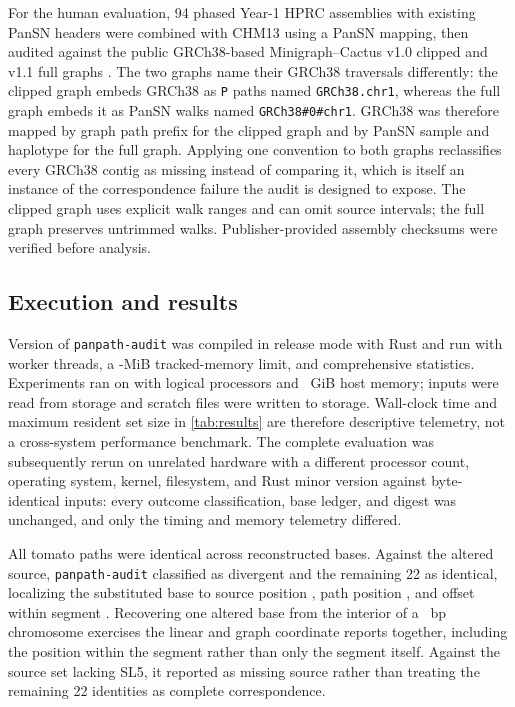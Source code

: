 \documentclass[10pt]{article}
\newcommand{\software}[1]{\texttt{#1}}
\begin{document}
For the human evaluation, 94 phased Year-1 HPRC assemblies with existing PanSN
headers were combined with CHM13 using a PanSN mapping, then audited against the
public GRCh38-based Minigraph--Cactus v1.0 clipped and v1.1 full graphs
\cite{liao2023draft,hickey2023minigraph}. The two graphs name their GRCh38
traversals differently: the clipped graph embeds GRCh38 as \texttt{P} paths named
\texttt{GRCh38.chr1}, whereas the full graph embeds it as PanSN walks named
\texttt{GRCh38\#0\#chr1}. GRCh38 was therefore mapped by graph path prefix for the
clipped graph and by PanSN sample and haplotype for the full graph. Applying one
convention to both graphs reclassifies every GRCh38 contig as missing instead of
comparing it, which is itself an instance of the correspondence failure the audit
is designed to expose. The clipped graph uses explicit walk ranges and can omit
source intervals; the full graph preserves untrimmed walks.
Publisher-provided assembly checksums were verified before analysis.

\subsection{Execution and results}

Version \EnvToolVersion{} of \software{panpath-audit} \cite{panpathsoftware} was
compiled in release mode with Rust \EnvRustVersion{} and run with \EnvThreads{}
worker threads, a \EnvMemoryMiB{}-MiB tracked-memory limit, and comprehensive
statistics. Experiments ran on \EnvPlatform{} with \EnvLogicalCpus{} logical
processors and \EnvHostMemory{}~GiB host memory; inputs were read from
\texttt{\EnvDataFilesystem{}} storage and scratch files were written to
\texttt{\EnvScratchFilesystem{}} storage. Wall-clock time and maximum resident
set size in \cref{tab:results} are therefore descriptive telemetry, not a
cross-system performance benchmark. The complete evaluation was subsequently
rerun on unrelated hardware with a different processor count, operating system,
kernel, filesystem, and Rust minor version against byte-identical inputs: every
outcome classification, base ledger, and digest was unchanged, and only the
timing and memory telemetry differed.



All \TomatoIdentical{} tomato paths were identical across
\TomatoGraphBases{} reconstructed bases. Against the altered source,
\software{panpath-audit} classified \TomatoDivergentIdentifier{} as divergent and
the remaining 22 as identical, localizing the substituted base to source position
\TomatoDivergenceSourcePosition{}, path position
\TomatoDivergencePathPosition{}, and offset
\TomatoDivergenceSegmentPosition{} within segment \TomatoDivergenceSegment{}.
Recovering one altered base from the interior of a
\TomatoDivergentSourceLength{}~bp chromosome exercises the linear and graph
coordinate reports together, including the position within the segment rather
than only the segment itself. Against the source set lacking SL5, it reported
\TomatoMissingIdentifier{} as missing source rather than treating the remaining
22 identities as complete correspondence.
\end{document}
